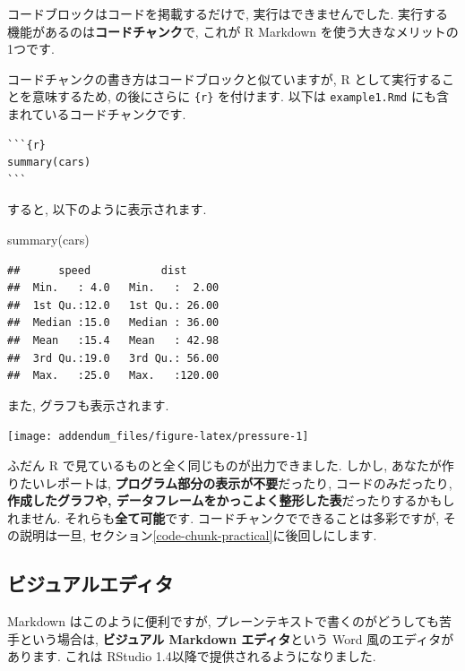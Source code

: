 \documentclass[
]{ltjsarticle}
\newenvironment{Shaded}{\begin{snugshade}}{\end{snugshade}}
\newcommand{\FunctionTok}[1]{\textcolor[rgb]{0.00,0.00,0.00}{#1}}
\newcommand{\NormalTok}[1]{#1}
\begin{document}
コードブロックはコードを掲載するだけで, 実行はできませんでした. 実行する機能があるのは\textbf{コードチャンク}で, これが R Markdown を使う大きなメリットの1つです.

コードチャンクの書き方はコードブロックと似ていますが, R として実行することを意味するため, \texttt{\textasciigrave{}\textasciigrave{}\textasciigrave{}} の後にさらに \texttt{\{r\}} を付けます. 以下は \texttt{example1.Rmd} にも含まれているコードチャンクです.

\begin{verbatim}
```{r}
summary(cars)
```
\end{verbatim}

すると, 以下のように表示されます.

\begin{Shaded}
\begin{Highlighting}[numbers=left,,]
\FunctionTok{summary}\NormalTok{(cars)}
\end{Highlighting}
\end{Shaded}

\begin{verbatim}
##      speed           dist       
##  Min.   : 4.0   Min.   :  2.00  
##  1st Qu.:12.0   1st Qu.: 26.00  
##  Median :15.0   Median : 36.00  
##  Mean   :15.4   Mean   : 42.98  
##  3rd Qu.:19.0   3rd Qu.: 56.00  
##  Max.   :25.0   Max.   :120.00
\end{verbatim}

また, グラフも表示されます.

\begin{center}\texttt{[image: addendum\_files/figure-latex/pressure-1]} \end{center}

ふだん R で見ているものと全く同じものが出力できました. しかし, あなたが作りたいレポートは, \textbf{プログラム部分の表示が不要}だったり, コードのみだったり, \textbf{作成したグラフや, データフレームをかっこよく整形した表}だったりするかもしれません. それらも\textbf{全て可能}です. コードチャンクでできることは多彩ですが, その説明は一旦, セクション\ref{code-chunk-practical}に後回しにします.

\hypertarget{ux30d3ux30b8ux30e5ux30a2ux30ebux30a8ux30c7ux30a3ux30bf}{%
\subsection{ビジュアルエディタ}\label{ux30d3ux30b8ux30e5ux30a2ux30ebux30a8ux30c7ux30a3ux30bf}}

Markdown はこのように便利ですが, プレーンテキストで書くのがどうしても苦手という場合は, \textbf{ビジュアル Markdown エディタ}という Word 風のエディタがあります. これは RStudio 1.4以降で提供されるようになりました.
\end{document}
